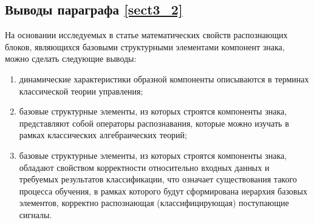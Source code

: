 \subsection{Выводы параграфа \ref{sect3_2}}
На основании исследуемых в статье математических свойств распознающих блоков, являющихся базовыми структурными элементами компонент знака, можно сделать следующие выводы:
\begin{enumerate}
\item 
	динамические характеристики образной компоненты описываются в терминах классической теории управления;
\item
	базовые структурные элементы, из которых строятся компоненты знака, представляют собой операторы распознавания, которые можно изучать в рамках классических алгебраических теорий;
\item
	базовые структурные элементы, из которых строятся компоненты знака, обладают свойством корректности относительно входных данных и требуемых результатов классификации, что означает существования такого процесса обучения, в рамках которого будут сформирована иерархия базовых элементов, корректно распознающая (классифицирующая) поступающие сигналы.
\end{enumerate}

\clearpage